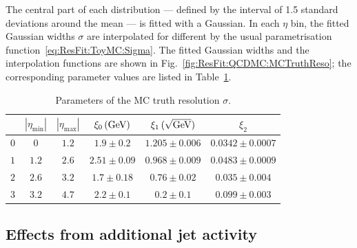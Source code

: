 The central part of each distribution --- defined by the interval of 1.5 standard deviations around the mean --- is fitted with a Gaussian.
In each $\eta$ bin, the fitted Gaussian widths $\sigma$ are interpolated for different \pt by the usual parametrisation function~\eqref{eq:ResFit:ToyMC:Sigma}.
The fitted Gaussian widths and the interpolation functions are shown in Fig.~\ref{fig:ResFit:QCDMC:MCTruthReso}; the corresponding parameter values are listed in Table~\ref{tab:ResFit:QCDMC:MCTruthReso}.
\begin{table}[ht]
  \caption{Parameters of the MC truth resolution $\sigma$.}
  \centering
  \begin{tabular}[h]{cccccc}
    \toprule
    & $|\eta_{\text{min}}|$ & $|\eta_{\text{max}}|$ & $\xi_{0}\,(\text{Ge}\kern-0.06667em\text{V})$ & $\xi_{1}\,(\sqrt{\text{Ge}\kern-0.06667em\text{V}})$ & $\xi_{2}$ \\
    \midrule
    $0$ & $0$ & $1.2$ & $1.9\pm0.2$ & $1.205\pm0.006$  & $0.0342\pm0.0007$ \\
    $1$ & $1.2$ & $2.6$ & $2.51\pm0.09$ & $0.968\pm0.009$  & $0.0483\pm0.0009$ \\
    $2$ & $2.6$ & $3.2$ & $1.7\pm0.18$ & $0.76\pm0.02$  & $0.035\pm0.004$ \\
    $3$ & $3.2$ & $4.7$ & $2.2\pm0.1$ & $0.2\pm0.1$  & $0.099\pm0.003$ \\
    \bottomrule
  \end{tabular}
  \label{tab:ResFit:QCDMC:MCTruthReso}
\end{table}




\subsection{Effects from additional jet activity}\label{sec:ResFit:QCDMC:AddJetAct}

